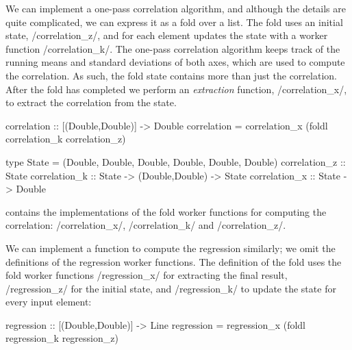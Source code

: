 
We can implement a one-pass correlation algorithm, and although the details are quite complicated, we can express it as a fold over a list.
The fold uses an initial state, \Hs/correlation_z/, and for each element updates the state with a worker function \Hs/correlation_k/.
The one-pass correlation algorithm keeps track of the running means and standard deviations of both axes, which are used to compute the correlation.
As such, the fold state contains more than just the correlation.
After the fold has completed we perform an \emph{extraction} function, \Hs/correlation_x/, to extract the correlation from the state.

\begin{haskell}
correlation :: [(Double,Double)] -> Double
correlation = correlation_x (foldl correlation_k correlation_z)

type State = (Double, Double, Double, Double, Double, Double)
correlation_z :: State
correlation_k :: State -> (Double,Double) -> State
correlation_x :: State -> Double
\end{haskell}

 contains the implementations of the fold worker functions for computing the correlation: \Hs/correlation_x/, \Hs/correlation_k/ and \Hs/correlation_z/.

We can implement a function to compute the regression similarly; we omit the definitions of the regression worker functions.
The definition of the fold uses the fold worker functions \Hs/regression_x/ for extracting the final result, \Hs/regression_z/ for the initial state, and \Hs/regression_k/ to update the state for every input element:

\begin{haskell}
regression :: [(Double,Double)] -> Line
regression = regression_x (foldl regression_k regression_z)
\end{haskell}

